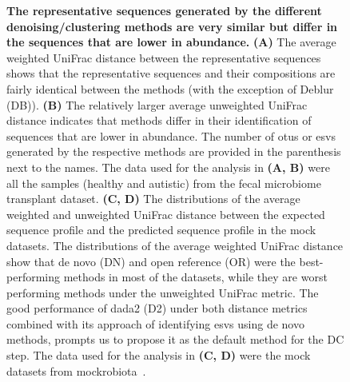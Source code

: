   \FloatBarrier
  \newpage
  \begin{figure}[H]
    \centering
    \caption{
      \textbf{The representative sequences generated by the different denoising/clustering methods are very similar but differ in the sequences that are lower in abundance.}
      \textbf{(A)} The average weighted UniFrac distance between the representative sequences shows that the representative sequences and their compositions are fairly identical between the methods (with the exception of Deblur (DB)).
      \textbf{(B)} The relatively larger average unweighted UniFrac distance indicates that methods differ in their identification of sequences that are lower in abundance.
      The number of \ac{otu}s or \ac{esv}s generated by the respective methods are provided in the parenthesis next to the names.
      The data used for the analysis in \textbf{(A, B)} were all the samples (healthy and autistic) from the fecal microbiome transplant dataset.
      \textbf{(C, D)} The distributions of the average weighted and unweighted UniFrac distance between the expected sequence profile and the predicted sequence profile in the mock datasets.
      The distributions of the average weighted UniFrac distance show that de novo (DN) and open reference (OR) were the best-performing methods in most of the datasets, while they are worst performing methods under the unweighted UniFrac metric.
      The good performance of dada2 (D2) under both distance metrics combined with its approach of identifying \ac{esv}s using de novo methods, prompts us to propose it as the default method for the DC step.
      The data used for the analysis in \textbf{(C, D)} were the mock datasets from mockrobiota~\cite{Bokulich2016}.
    }
    \label{fig:figure2}
  \end{figure}


